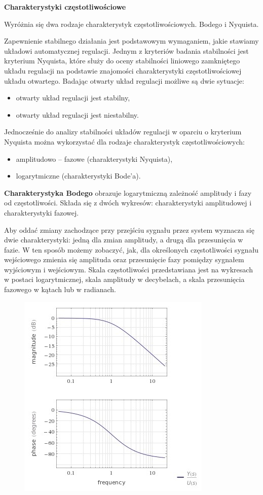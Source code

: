\textbf{Charakterystyki częstotliwościowe}

Wyróżnia się dwa rodzaje charakterystyk częstotliwościowych. Bodego i Nyquista.

Zapewnienie stabilnego działania jest podstawowym wymaganiem, jakie stawiamy układowi automatycznej regulacji. Jednym z kryteriów badania stabilności jest kryterium Nyquista, które służy do oceny stabilności liniowego zamkniętego układu regulacji na podstawie znajomości charakterystyki częstotliwościowej układu otwartego. Badając otwarty układ regulacji możliwe są dwie sytuacje:
\begin{itemize}
    \item otwarty układ regulacji jest stabilny,
    \item otwarty układ regulacji jest niestabilny.
\end{itemize}
Jednocześnie do analizy stabilności układów regulacji w oparciu o kryterium Nyquista można wykorzystać dla rodzaje charakterystyk częstotliwościowych:
\begin{itemize}
    \item amplitudowo – fazowe (charakterystyki Nyquista),
    \item logarytmiczne (charakterystyki Bode’a). 
\end{itemize}

\textbf{Charakterystyka Bodego} obrazuje logarytmiczną zależność amplitudy i fazy od częstotliwości. Składa się z dwóch wykresów: charakterystyki amplitudowej i charakterystyki fazowej.

Aby oddać zmiany zachodzące przy przejściu sygnału przez system wyznacza się dwie charakterystyki: jedną dla zmian amplitudy, a drugą dla przesunięcia w fazie. W ten sposób możemy zobaczyć, jak, dla określonych częstotliwości sygnału wejściowego zmienia się amplituda oraz przesunięcie fazy pomiędzy sygnałem wyjściowym i wejściowym. Skala częstotliwości przedstawiana jest na wykresach w postaci logarytmicznej, skala amplitudy w decybelach, a skala przesunięcia fazowego w kątach lub w radianach.

\begin{figure}[!h]
\centering
\includegraphics[width=0.5\linewidth]{fig/Bode.png}
\end{figure}

